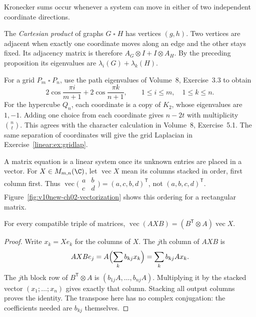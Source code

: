 Kronecker sums occur whenever a system can move in either of two independent coordinate directions.

\begin{example}\label{linear:exa:grid}
The \emph{Cartesian product} of graphs $G\mathbin\square H$ has vertices $(g,h)$. Two vertices are adjacent when exactly one coordinate moves along an edge and the other stays fixed. Its adjacency matrix is therefore
$A_G\otimes I+I\otimes A_H$. By the preceding proposition its eigenvalues are $\lambda_i(G)+\lambda_k(H)$.

For a grid $P_m\mathbin\square P_n$, use the path eigenvalues of Volume~8, Exercise~3.3 to obtain
\[
2\cos\frac{\pi i}{m+1}+2\cos\frac{\pi k}{n+1},
\qquad 1\le i\le m,\quad1\le k\le n.
\]
For the hypercube $Q_n$, each coordinate is a copy of $K_2$, whose eigenvalues are $1,-1$. Adding one choice from each coordinate gives $n-2t$ with multiplicity $\binom nt$. This agrees with the character calculation in Volume~8, Exercise~5.1. The same separation of coordinates will give the grid Laplacian in Exercise~\ref{linear:ex:gridlap}.
\end{example}

A matrix equation is a linear system once its unknown entries are placed in a vector. For $X\in M_{m,n}(\C)$, let $\operatorname{vec}X$ mean its columns stacked in order, first column first. Thus
$\operatorname{vec}\bigl(\begin{smallmatrix}a&b\\c&d\end{smallmatrix}\bigr)=(a,c,b,d)^{\mathsf T}$, not $(a,b,c,d)^{\mathsf T}$. Figure~\ref{fig:v10new-ch02-vectorization} shows this ordering for a rectangular matrix.

\begin{proposition}\label{linear:prop:vec}
For every compatible triple of matrices,
$\operatorname{vec}(AXB)=(B^{\mathsf T}\otimes A)\operatorname{vec}X$.
\end{proposition}
\begin{proof}
Write $x_k=Xe_k$ for the columns of $X$. The $j$th column of $AXB$ is
\[
AXB e_j=A\Bigl(\sum_kb_{kj}x_k\Bigr)=\sum_kb_{kj}Ax_k.
\]
The $j$th block row of $B^{\mathsf T}\otimes A$ is $(b_{1j}A,\ldots,b_{nj}A)$. Multiplying it by the stacked vector $(x_1;\ldots;x_n)$ gives exactly that column. Stacking all output columns proves the identity. The transpose here has no complex conjugation: the coefficients needed are $b_{kj}$ themselves.
\end{proof}


